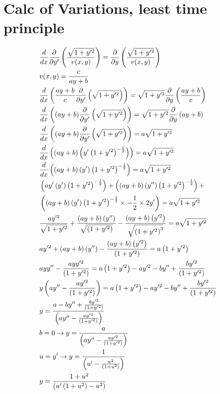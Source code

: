 \documentclass{article}
\begin{document}
	\section{Calc of Variations, least time principle}
	\begin{align}
		&\frac{d}{dx}\frac{\partial}{\partial y'}\left(\frac{\sqrt{1+y'^2}}{v(x,y)}\right) = \frac{\partial}{\partial y} \left(\frac{\sqrt{1+y'^2}}{v(x,y)}\right)\\
		&v(x,y) = \frac{c}{ay+b}\\
		&\frac{d}{dx}\left(\frac{ay+b}{c}\frac{\partial}{\partial y'}\left(\sqrt{1+y'^2}\right)\right) = \sqrt{1+y'^2}\frac{\partial}{\partial y} \left(\frac{ay+b}{c}\right)\\
		&\frac{d}{dx}\left((ay+b)\frac{\partial}{\partial y'}\left(\sqrt{1+y'^2}\right)\right) = \sqrt{1+y'^2}\frac{\partial}{\partial y} \left(ay+b\right)\\
		&\frac{d}{dx}\left((ay+b)\frac{\partial}{\partial y'}\left(\sqrt{1+y'^2}\right)\right) = a\sqrt{1+y'^2}\\
		&\frac{d}{dx}\left((ay+b)\left(y'\left(1+y'^2\right)^{-\frac{1}{2}}\right)\right) = a\sqrt{1+y'^2}\\
		&\frac{d}{dx}\left((ay+b)\left(y'\right)\left(1+y'^2\right)^{-\frac{1}{2}}\right) = a\sqrt{1+y'^2}\\
		&\left(ay'\left(y'\right)\left(1+y'^2\right)^{-\frac{1}{2}}\right) + \left((ay+b)\left(y''\right)\left(1+y'^2\right)^{-\frac{1}{2}}\right) + \\
		&\left((ay+b)\left(y'\right)\left(1+y'^2\right)^{-\frac{3}{2}}\times -\frac{1}{2} \times 2y'\right) = a\sqrt{1+y'^2} \notag \\
		&\frac{ay'^2}{\sqrt{1+y'^2}} + \frac{(ay+b)\left(y''\right)}{\sqrt{\left(1+y'^2\right)}} - \frac{(ay+b)\left(y'^2\right)}{\sqrt{\left(1+y'^2\right)^3}} = a\sqrt{1+y'^2}\\
		&ay'^2 + (ay+b)\left(y''\right) - \frac{(ay+b)\left(y'^2\right)}{\left(1+y'^2\right)} = a\left(1+y'^2\right)\\
		&ayy'' - \frac{ayy'^2}{\left(1+y'^2\right)} = a\left(1+y'^2\right) - ay'^2 - by'' + \frac{by'^2}{\left(1+y'^2\right)}\\
		&y\left(ay'' - \frac{ay'^2}{\left(1+y'^2\right)}\right) = a\left(1+y'^2\right) - ay'^2 - by'' + \frac{by'^2}{\left(1+y'^2\right)}\\
		&y = \frac{a - by'' + \frac{by'^2}{\left(1+y'^2\right)}}{\left(ay'' - \frac{ay'^2}{\left(1+y'^2\right)}\right)}\\
		&b=0 \rightarrow y = \frac{a}{\left(ay'' - \frac{ay'^2}{\left(1+y'^2\right)}\right)}\\
		& u = y' \rightarrow y = \frac{1}{\left(u' - \frac{u^2}{\left(1+u^2\right)}\right)}\\
		& y = \frac{1+u^2}{\left(u'\left(1+u^2\right) - u^2\right)}\\
	\end{align}
	
\end{document}
